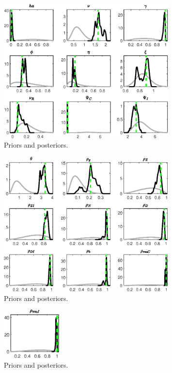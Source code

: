 \begin{figure}[H]
\centering
\includegraphics[width=0.80\textwidth]{BRS_sectoral_wo_vcu/Output/BRS_sectoral_wo_vcu_PriorsAndPosteriors3}
\caption{Priors and posteriors.}\label{Fig:PriorsAndPosteriors:3}
\end{figure}
 
\begin{figure}[H]
\centering
\includegraphics[width=0.80\textwidth]{BRS_sectoral_wo_vcu/Output/BRS_sectoral_wo_vcu_PriorsAndPosteriors4}
\caption{Priors and posteriors.}\label{Fig:PriorsAndPosteriors:4}
\end{figure}
 
\begin{figure}[H]
\centering
\includegraphics[width=0.27\textwidth]{BRS_sectoral_wo_vcu/Output/BRS_sectoral_wo_vcu_PriorsAndPosteriors5}
\caption{Priors and posteriors.}\label{Fig:PriorsAndPosteriors:5}
\end{figure}
 
